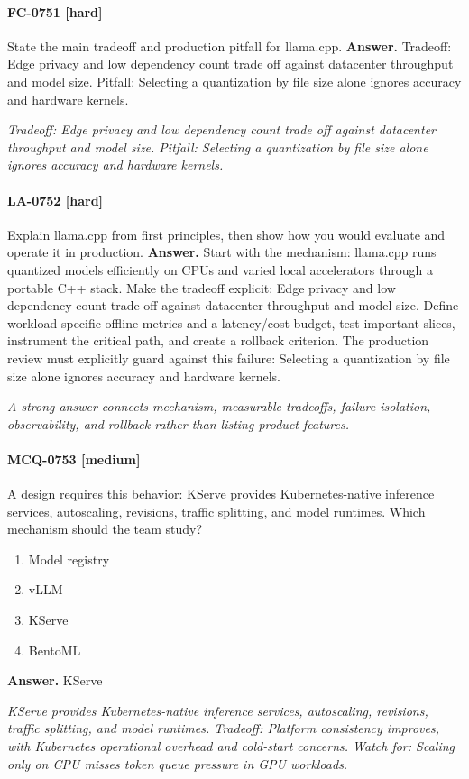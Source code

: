 \paragraph{FC-0751 [hard]} State the main tradeoff and production pitfall for llama.cpp.
\noindent\textbf{Answer.} Tradeoff: Edge privacy and low dependency count trade off against datacenter throughput and model size. Pitfall: Selecting a quantization by file size alone ignores accuracy and hardware kernels.
\par\textit{Tradeoff: Edge privacy and low dependency count trade off against datacenter throughput and model size. Pitfall: Selecting a quantization by file size alone ignores accuracy and hardware kernels.}
\paragraph{LA-0752 [hard]} Explain llama.cpp from first principles, then show how you would evaluate and operate it in production.
\noindent\textbf{Answer.} Start with the mechanism: llama.cpp runs quantized models efficiently on CPUs and varied local accelerators through a portable C++ stack. Make the tradeoff explicit: Edge privacy and low dependency count trade off against datacenter throughput and model size. Define workload-specific offline metrics and a latency/cost budget, test important slices, instrument the critical path, and create a rollback criterion. The production review must explicitly guard against this failure: Selecting a quantization by file size alone ignores accuracy and hardware kernels.
\par\textit{A strong answer connects mechanism, measurable tradeoffs, failure isolation, observability, and rollback rather than listing product features.}
\paragraph{MCQ-0753 [medium]} A design requires this behavior: KServe provides Kubernetes-native inference services, autoscaling, revisions, traffic splitting, and model runtimes. Which mechanism should the team study?
\begin{enumerate}[label=\Alph*.]
\item Model registry
\item vLLM
\item KServe
\item BentoML
\end{enumerate}
\noindent\textbf{Answer.} KServe
\par\textit{KServe provides Kubernetes-native inference services, autoscaling, revisions, traffic splitting, and model runtimes. Tradeoff: Platform consistency improves, with Kubernetes operational overhead and cold-start concerns. Watch for: Scaling only on CPU misses token queue pressure in GPU workloads.}
